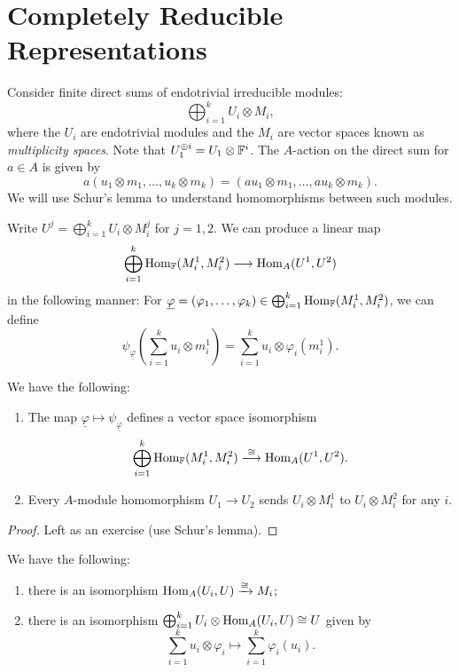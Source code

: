 \section{Completely Reducible Representations}

\begin{remark}
  Consider finite direct sums of
  endotrivial irreducible modules:
  \[
    \bigoplus_{i = 1}^k U_i \otimes M_i,
  \]
  where the $U_i$ are endotrivial
  modules and the $M_i$ are
  vector spaces known as
  \emph{multiplicity spaces}. Note that
  $U_1^{\oplus i} = U_1 \otimes \mathbb{F}^i$.
  The
  $A$-action on the direct sum for
  $a \in A$ is given by
  \[
    a(u_1 \otimes m_1, \dots, u_k \otimes m_k)
    = (au_1 \otimes m_1, \dots, au_k \otimes m_k).
  \]
  We will use Schur's lemma to understand
  homomorphisms between such modules.

  Write $U^j = \bigoplus_{i = 1}^k U_i \otimes M_i^j$
  for $j = 1, 2$. We can produce a linear
  map
  \[
    \bigoplus_{i = 1}^k \operatorname{Hom}_{\mathbb{F}}(M_i^1, M_i^2)
    \longrightarrow \operatorname{Hom}_A(U^1, U^2)
  \]
  in the following manner:
  For $\underline{\varphi} = (\varphi_1, \dots, \varphi_k) \in \bigoplus_{i = 1}^k \operatorname{Hom}_{\mathbb{F}}(M_i^1, M_i^2)$,
  we can define
  \[
    \psi_{\underline{\varphi}}\left(
      \sum_{i = 1}^k u_i \otimes m_i^1
    \right)
    = \sum_{i = 1}^k u_i \otimes \varphi_i(m_i^1).
  \]
\end{remark}

\begin{theorem}
  We have the following:
  \begin{enumerate}
    \item The map $\underline{\varphi} \mapsto \psi_{\underline{\varphi}}$
      defines a vector space isomorphism
      \[
        \bigoplus_{i = 1}^k \operatorname{Hom}_{\mathbb{F}}(M_i^1, M_i^2)
        \overset{\cong}\longrightarrow \operatorname{Hom}_A(U^1, U^2).
      \]
    \item Every $A$-module homomorphism
      $U_1 \to U_2$ sends
      $U_i \otimes M_i^1$ to
      $U_i \otimes M_i^2$ for any $i$.
  \end{enumerate}
\end{theorem}

\begin{proof}
  Left as an exercise (use Schur's lemma).
\end{proof}

\begin{corollary}\label{cor:hom-isomorphism}
  We have the following:
  \begin{enumerate}
    \item there is an isomorphism
      $\operatorname{Hom}_A(U_i, U) \xrightarrow{\cong} M_i$;
    \item there is an isomorphism
      $\bigoplus_{i = 1}^k U_i \otimes \operatorname{Hom}_A(U_i, U) \cong U$
      given by
      \[
        \sum_{i = 1}^k u_i \otimes \varphi_i
        \longmapsto \sum_{i = 1}^k \varphi_i(u_i).
      \]
  \end{enumerate}
\end{corollary}

